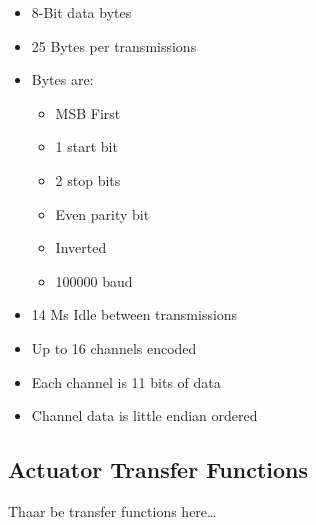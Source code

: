 \begin{itemize}
\item 8-Bit data bytes
\item 25 Bytes per transmissions
\item Bytes are:
\begin{itemize}
\item MSB First
\item 1 start bit
\item 2 stop bits
\item Even parity bit
\item Inverted
\item 100000 baud
\end{itemize}
\item 14 Ms Idle between transmissions
\item Up to 16 channels encoded
\item Each channel is 11 bits of data
\item Channel data is little endian ordered
\end{itemize}


\newpage
\subsection{Actuator Transfer Functions}
\label{subsec:proto.design.transfer}
Thaar be transfer functions here\ldots

